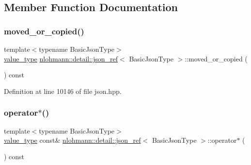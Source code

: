 \subsection{Member Function Documentation}
\mbox{\label{classnlohmann_1_1detail_1_1json__ref_ae39e523218bf05cac3fb5b5b1cd5efb6}} 
\subsubsection{\texorpdfstring{moved\+\_\+or\+\_\+copied()}{moved\_or\_copied()}}
{\footnotesize\ttfamily template$<$typename Basic\+Json\+Type$>$ \\
\hyperlink{classnlohmann_1_1detail_1_1json__ref_a78d76cf288141049568c0d670ed670ef}{value\+\_\+type} \hyperlink{classnlohmann_1_1detail_1_1json__ref}{nlohmann\+::detail\+::json\+\_\+ref}$<$ Basic\+Json\+Type $>$\+::moved\+\_\+or\+\_\+copied (\begin{DoxyParamCaption}{ }\end{DoxyParamCaption}) const\hspace{0.3cm}{\ttfamily [inline]}}



Definition at line 10146 of file json.\+hpp.

\mbox{\label{classnlohmann_1_1detail_1_1json__ref_aa3100e41472dba02ab78ccc1607e44ab}} 
\subsubsection{\texorpdfstring{operator$\ast$()}{operator*()}}
{\footnotesize\ttfamily template$<$typename Basic\+Json\+Type$>$ \\
\hyperlink{classnlohmann_1_1detail_1_1json__ref_a78d76cf288141049568c0d670ed670ef}{value\+\_\+type} const\& \hyperlink{classnlohmann_1_1detail_1_1json__ref}{nlohmann\+::detail\+::json\+\_\+ref}$<$ Basic\+Json\+Type $>$\+::operator$\ast$ (\begin{DoxyParamCaption}{ }\end{DoxyParamCaption}) const\hspace{0.3cm}{\ttfamily [inline]}}



